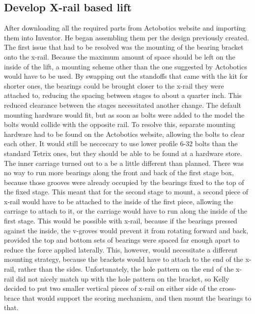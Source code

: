 \documentclass{article}
\begin{document}
\subsection{Develop X-rail based lift}
 After downloading all the required parts from Actobotics website and importing them into Inventor. He began assembling them per the design previously created. The first issue that had to be resolved was the mounting of the bearing bracket onto the x-rail. Because the maximum amount of space should be left on the inside of the lift, a mounting scheme other than the one suggested by Actobotics would have to be used. By swapping out the standoffs that came with the kit for shorter ones, the bearings could be brought closer to the x-rail they were attached to, reducing the spacing between stages to about a quarter inch. This reduced clearance between the stages necessitated another change. The default mounting hardware would fit, but as soon as bolts were added to the model the bolts would collide with the opposite rail. To resolve this, separate mounting hardware had to be found on the Actobotics website, allowing the bolts to clear each other. It would still be neccecary to use lower profile 6-32 bolts than the standard Tetrix ones, but they should be able to be found at a hardware store. The inner carriage turned out to a be a little different than planned. There was no way to run more bearings along the front and back of the first stage box, because those grooves were already occupied by the bearings fixed to the top of the fixed stage. This meant that for the second stage to mount, a second piece of x-rail would have to be attached to the inside of the first piece, allowing the carriage to attach to it, or the carriage would have to run along the inside of the first stage. This would be possible with x-rail, because if the bearings pressed against the inside, the v-groves would prevent it from rotating forward and back, provided the top and bottom sets of bearings were spaced far enough apart to reduce the force applied laterally. This, however, would necessitate a different mounting strategy, because the brackets would have to attach to the end of the x-rail, rather than the sides. Unfortunately, the hole pattern on the end of the x-rail did not nicely match up with the hole pattern on the bracket, so Kelly decided to put two smaller vertical pieces of x-rail on either side of the cross-brace that would support the scoring mechanism, and then mount the bearings to that. 
\end{document}
